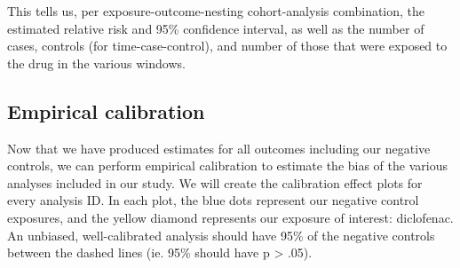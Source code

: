 \documentclass[]{article}
\newenvironment{Shaded}{\begin{snugshade}}{\end{snugshade}}
\newcommand{\CommentTok}[1]{\textcolor[rgb]{0.56,0.35,0.01}{\textit{#1}}}
\newcommand{\DataTypeTok}[1]{\textcolor[rgb]{0.13,0.29,0.53}{#1}}
\newcommand{\DecValTok}[1]{\textcolor[rgb]{0.00,0.00,0.81}{#1}}
\newcommand{\KeywordTok}[1]{\textcolor[rgb]{0.13,0.29,0.53}{\textbf{#1}}}
\newcommand{\NormalTok}[1]{#1}
\newcommand{\OperatorTok}[1]{\textcolor[rgb]{0.81,0.36,0.00}{\textbf{#1}}}
\newcommand{\StringTok}[1]{\textcolor[rgb]{0.31,0.60,0.02}{#1}}
\begin{document}
This tells us, per exposure-outcome-nesting cohort-analysis combination,
the estimated relative risk and 95\% confidence interval, as well as the
number of cases, controls (for time-case-control), and number of those
that were exposed to the drug in the various windows.

\hypertarget{empirical-calibration}{%
\subsection{Empirical calibration}\label{empirical-calibration}}

Now that we have produced estimates for all outcomes including our
negative controls, we can perform empirical calibration to estimate the
bias of the various analyses included in our study. We will create the
calibration effect plots for every analysis ID. In each plot, the blue
dots represent our negative control exposures, and the yellow diamond
represents our exposure of interest: diclofenac. An unbiased,
well-calibrated analysis should have 95\% of the negative controls
between the dashed lines (ie. 95\% should have p \textgreater{} .05).

\begin{Shaded}
\end{Shaded}
\end{document}
